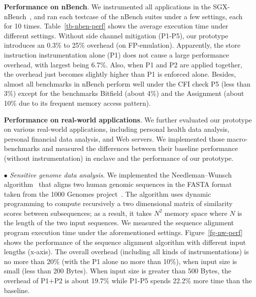 \vspace{3pt}\noindent\textbf{Performance on nBench}. We instrumented all applications in the SGX-nBench~\cite{sgxnbench}, and ran each testcase of the nBench suites under a few settings, each for 10 times. 
Table~\ref{tb-nben-perf} shows the average execution time under different settings.
Without side channel mitigation (P1-P5), our prototype introduces an 0.3\% to 25\% overhead (on FP-emulation). %
Apparently, the store instruction instrumentation alone (P1) does not cause a large performance overhead, with largest being 6.7\%. Also, when P1 and P2 are applied together, the overhead just becomes slightly higher than P1 is enforced alone. %
Besides, almost all benchmarks in nBench perform well under the CFI check P5 (less than 3\%) except for the benchmarks Bitfield (about 4\%) and the Assignment (about 10\% due to its frequent memory access pattern).

\vspace{3pt}\noindent\textbf{Performance on real-world applications}.  We further evaluated our prototype on various real-world applications, including personal health data analysis, personal financial data analysis, and Web servers. 
We implemented those macro-benchmarks and measured the differences between their baseline performance (without instrumentation) in enclave and the performance of our prototype.


\vspace{2pt}\noindent$\bullet$\textit{ Sensitive genome data analysis}. We implemented the Needleman–Wunsch algorithm~\cite{needleman1970general} that aligns two human genomic sequences in the FASTA format~\cite{fasta-format} taken from the 1000 Genomes project~\cite{1000genomes}. The algorithm uses dynamic programming to compute recursively a two dimensional matrix of similarity scores between subsequences; as a result, it takes $N^2$ memory space where $N$ is the length of the two input sequences. 
We measured the sequence alignment program execution time under the aforementioned settings. Figure~\ref{fg-nw-perf} shows the performance of the sequence alignment algorithm with different input lengths (x-axis). The overall overhead (including all kinds of instrumentations) is no more than 20\% (with the P1 alone no more than 10\%), when input size is small (less than 200 Bytes). When input size is greater than 500 Bytes, the overhead of P1+P2 is about 19.7\%  while P1-P5 spends 22.2\% more time than the baseline.

